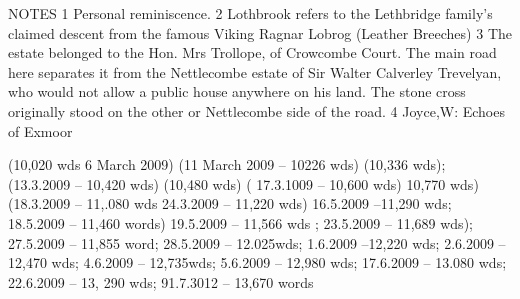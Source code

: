 \documentclass[10pt,a4paper]{article}
\begin{document}
				







NOTES
1 Personal reminiscence.
2 Lothbrook refers to the Lethbridge family’s claimed descent from the famous Viking Ragnar Lobrog (Leather Breeches)
3 The estate belonged to the Hon. Mrs Trollope, of Crowcombe Court. The main road here separates it from  the Nettlecombe estate of Sir Walter Calverley Trevelyan,  who would not allow a public house anywhere on his land.  The stone cross originally stood on the other or Nettlecombe side of the road. 
4 Joyce,W: Echoes of Exmoor

(10,020 wds 6 March 2009)   (11 March 2009 – 10226 wds)  (10,336 wds);
 (13.3.2009 – 10,420 wds)       (10,480 wds)  (     17.3.1009 – 10,600 wds) 
 10,770 wds)   (18.3.2009 – 11,.080 wds 24.3.2009 – 11,220 wds)   16.5.2009 –11,290 wds; 18.5.2009 – 11,460 words)   19.5.2009 – 11,566 wds ; 23.5.2009 – 11,689 wds); 27.5.2009 – 11,855 word;  	28.5.2009 – 12.025wds;  1.6.2009 –12,220 wds;  2.6.2009 – 12,470 wds;  4.6.2009 – 12,735wds;  5.6.2009 – 12,980 wds; 17.6.2009 – 13.080 wds;  22.6.2009 – 13, 290 wds; 91.7.3012 – 13,670 words
 

				 
 
 
\end{document}
